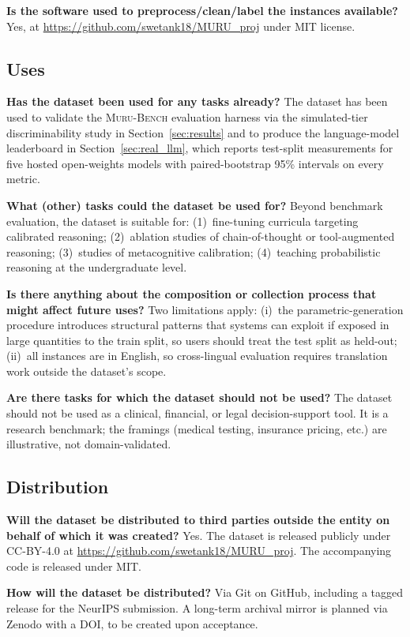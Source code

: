 \documentclass{article}
\newcommand{\muru}{\textsc{Muru-Bench}}
\begin{document}
\textbf{Is the software used to preprocess/clean/label the instances available?}
Yes, at \url{https://github.com/swetank18/MURU_proj} under MIT license.

\subsection*{Uses}

\textbf{Has the dataset been used for any tasks already?}
The dataset has been used to validate the \muru{} evaluation harness via the simulated-tier discriminability study in Section~\ref{sec:results} and to produce the language-model leaderboard in Section~\ref{sec:real_llm}, which reports test-split measurements for five hosted open-weights models with paired-bootstrap 95\% intervals on every metric.

\textbf{What (other) tasks could the dataset be used for?}
Beyond benchmark evaluation, the dataset is suitable for: (1)~fine-tuning curricula targeting calibrated reasoning; (2)~ablation studies of chain-of-thought or tool-augmented reasoning; (3)~studies of metacognitive calibration; (4)~teaching probabilistic reasoning at the undergraduate level.

\textbf{Is there anything about the composition or collection process that might affect future uses?}
Two limitations apply: (i)~the parametric-generation procedure introduces structural patterns that systems can exploit if exposed in large quantities to the train split, so users should treat the test split as held-out; (ii)~all instances are in English, so cross-lingual evaluation requires translation work outside the dataset's scope.

\textbf{Are there tasks for which the dataset should not be used?}
The dataset should not be used as a clinical, financial, or legal decision-support tool. It is a research benchmark; the framings (medical testing, insurance pricing, etc.) are illustrative, not domain-validated.

\subsection*{Distribution}

\textbf{Will the dataset be distributed to third parties outside the entity on behalf of which it was created?}
Yes. The dataset is released publicly under CC-BY-4.0 at \url{https://github.com/swetank18/MURU_proj}. The accompanying code is released under MIT.

\textbf{How will the dataset be distributed?}
Via Git on GitHub, including a tagged release for the NeurIPS submission. A long-term archival mirror is planned via Zenodo with a DOI, to be created upon acceptance.
\end{document}
